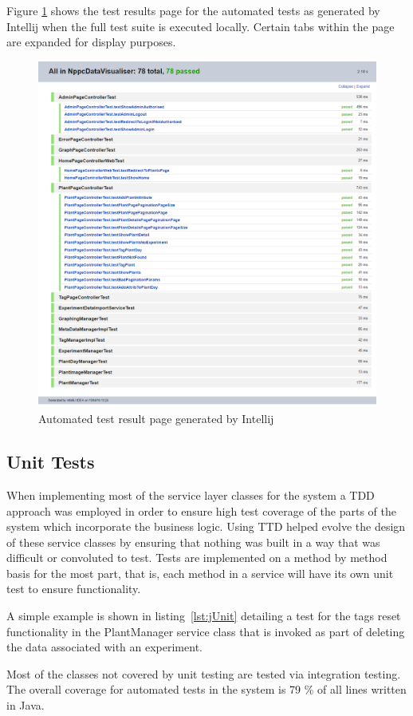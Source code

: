 Figure \ref{fig:testrel} shows the test results page for the automated tests as generated by Intellij when the full test suite is executed locally. Certain tabs within the page are expanded for display purposes.

\begin{figure}[H]
    \centering
    \includegraphics[width=\textwidth]{images/testing/results}
    \caption{Automated test result page generated by Intellij }
    \label{fig:testrel}
\end{figure} 

\subsection{Unit Tests}

 When implementing most of the service layer classes for the system a TDD approach was employed in order to ensure high test coverage of the parts of the system which incorporate the business logic. Using TTD helped evolve the design of these service classes by ensuring that nothing was built in a way that was difficult or convoluted to test. Tests are implemented on a method by method basis for the most part, that is, each method in a service will have its own unit test to ensure functionality.
 
  A simple example is shown in listing~\ref{lst:jUnit} detailing a test for the tags reset functionality in the PlantManager service class that is invoked as part of deleting the data associated with an experiment.
\lstjava

Most of the classes not covered by unit testing are tested via integration testing. The overall coverage for automated tests in the system is 79 \% of all lines written in Java.

